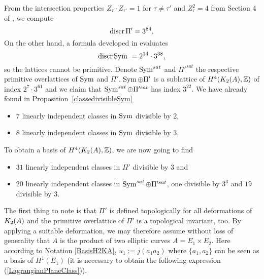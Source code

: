 From the intersection properties $Z_\tau \cdot Z_{\tau'} = 1$ for $\tau\neq \tau'$ and $Z_\tau^2 = 4$ from Section 4 of \cite{Hassett}, we compute
\begin{equation}
 \operatorname{discr} \Pi' = 3^{84}.
 \label{discrPi}
\end{equation}
On the other hand, a formula developed in \cite{Kapfer} evaluates
\begin{equation} \label{DiscrSym}
\operatorname{discr} \operatorname{Sym} \ = 2^{14}\cdot 3^{38},
\end{equation}
so the lattices cannot be primitive. Denote $\operatorname{Sym}^{sat}$ and $\Pi'^{sat}$ the respective primitive overlattices of $\operatorname{Sym}$ and $\Pi'$. $\operatorname{Sym} \oplus\Pi'$ is a sublattice of $H^4(K_{ 2 }( A ),\mathbb{Z})$ of index $2^{7}\cdot 3^{61}$ and we claim that $\operatorname{Sym}^{sat}\oplus \Pi'^{sat}$ has index $3^{22}$. 
We have already found in Proposition~\ref{classedivisibleSym}
\begin{itemize}
 \item $7$ linearly independent classes in $\operatorname{Sym}$ divisible by $2$,
 \item $8$ linearly independent classes in $\operatorname{Sym}$ divisible by $3$,
\end{itemize}
To obtain a basis of $H^4(K_{ 2 }( A ),\mathbb{Z})$, 
we are now going to find
\begin{itemize}
 \item $31$ linearly independent classes in $\Pi'$ divisible by $3$ and
 \item $20$ linearly independent classes in $\operatorname{Sym}^{sat}\oplus \Pi'^{sat}$, one divisible by $3^3$ and $19$ divisible by $3$.
\end{itemize}


The first thing to note is that $\Pi'$ is defined topologically for all deformations of $K_{ 2 }( A )$ and the primitive overlattice of $\Pi'$ is a topological invariant, too.  
By applying a suitable deformation, we may therefore assume without loss of generality that $A$ is the product of two elliptic curves $A=E_1\times E_2$. Here according to Notation \ref{BasisH2KA}, $u_1:=j(a_1 a_2)$ where $\{a_1,a_2\}$ can be seen as a basis of $H^1(E_1)$ (it is necessary to obtain the following expression (\ref{LagrangianPlaneClass})).

